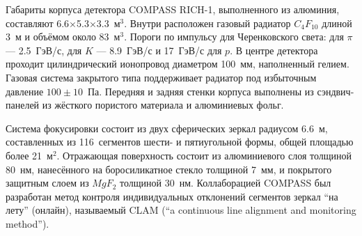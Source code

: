 


Габариты корпуса детектора COMPASS \mbox{RICH-1}, выполненного из алюминия, составляют 6.6$\times$5.3$\times$3.3~м$^3$. Внутри расположен газовый радиатор $C_{4}F_{10}$ длиной 3~м и объёмом около 83~м$^3$. Пороги по импульсу для Черенковского света: для $\pi$ --- 2.5~ГэВ/с, для $K$ --- 8.9~ГэВ/с и 17~ГэВ/с для $p$. В центре детектора проходит цилиндрический ионопровод диаметром 100~мм, наполненный гелием. Газовая система закрытого типа поддерживает радиатор под избыточным давление $100\pm10$~Па. Передняя и задняя стенки корпуса выполнены из сэндвич-панелей из жёсткого пористого материала и алюминиевых фольг.




Система фокусировки состоит из двух сферических зеркал радиусом 6.6~м, составленных из 116~сегментов шести- и пятиугольной формы, общей площадью более 21~м$^2$. Отражающая поверхность состоит из алюминиевого слоя толщиной 80~нм, нанесённого на боросиликатное стекло толщиной 7~мм, и покрытого защитным слоем из $MgF_{2}$ толщиной 30~нм. Коллаборацией COMPASS был разработан метод контроля индивидуальных отклонений сегментов зеркал ``на лету'' (онлайн), называемый CLAM (``a continuous line alignment and monitoring method''). 

